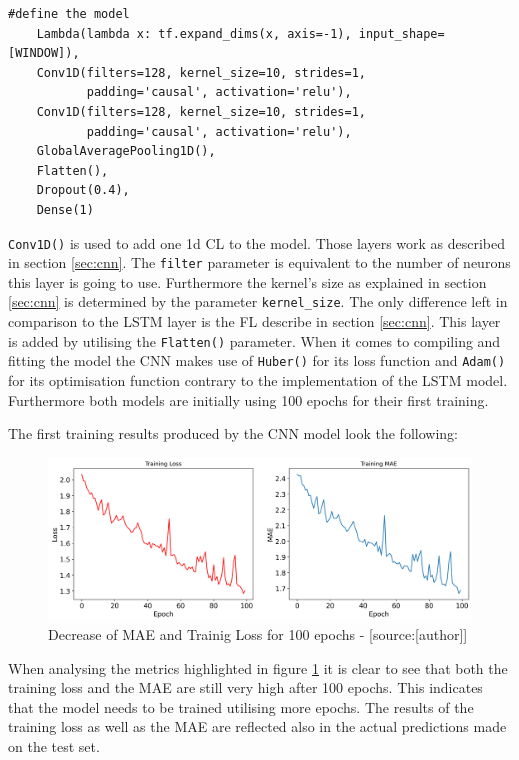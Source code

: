  \begin{lstlisting}
#define the model 
    Lambda(lambda x: tf.expand_dims(x, axis=-1), input_shape=[WINDOW]),
    Conv1D(filters=128, kernel_size=10, strides=1,
           padding='causal', activation='relu'),
    Conv1D(filters=128, kernel_size=10, strides=1,
           padding='causal', activation='relu'),
    GlobalAveragePooling1D(),
    Flatten(),
    Dropout(0.4),
    Dense(1)
\end{lstlisting}
\verb|Conv1D()| is used to add one 1d CL to the model. Those layers work as described in section \ref{sec:cnn}.  The \verb|filter| parameter is equivalent to the number of neurons this layer is going to use. Furthermore the kernel's size as explained in section \ref{sec:cnn} is determined by the parameter \verb|kernel_size|.
The only difference left in comparison to the LSTM layer is the FL describe in section \ref{sec:cnn}. This layer is added by utilising the \verb|Flatten()| parameter. When it comes to compiling and fitting the model the CNN makes use of  \verb|Huber()| for its loss function and \verb|Adam()| for its optimisation function contrary to the implementation of the LSTM model. Furthermore both models are initially using 100 epochs for their first training. \newline

The first training results produced by the CNN model look the following: 

\begin{figure}[H]
	\centering
		\includegraphics[width=14cm]{images/cnn_model_1_loss}
	\caption{Decrease of MAE and Trainig Loss for 100 epochs - [source:[author]]}
	\label{fig:training_test_cnn}
\end{figure}
When analysing the metrics highlighted in figure \ref{fig:training_test_cnn} it is clear to see that both the training loss and the MAE are still very high after 100 epochs. This indicates that the model needs to be trained utilising more epochs. The results of the training loss as well as the MAE are reflected also in the actual predictions made on the test set.

